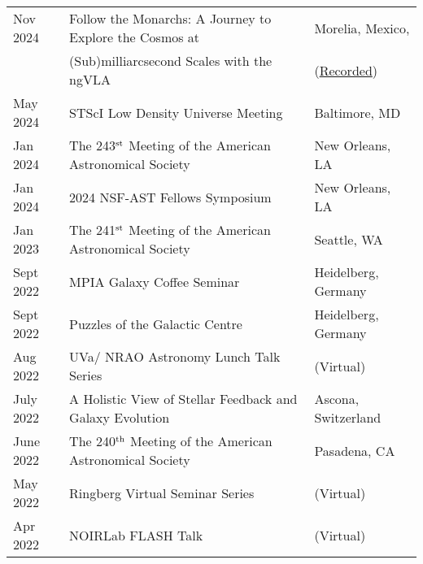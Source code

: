 \documentclass[11pt]{article}
\begin{document}
\begin{longtable}{p{} p{}p{}}

Nov 2024 & Follow the Monarchs: A Journey to Explore the Cosmos at  & {\small Morelia, Mexico,}\\
& (Sub)milliarcsecond Scales with the ngVLA & {\small(\href{https://youtu.be/CHdCz9VyqIM?si=kyrCyJ9LXm9UtWOj&t=3514}{Recorded})}\\

May 2024 & STScI Low Density Universe Meeting & {\small Baltimore, MD}\\

Jan 2024 & The 243$^{\rm st}$ Meeting of the American Astronomical Society & {\small New Orleans, LA}\\

Jan 2024 & 2024 NSF-AST Fellows Symposium & {\small New Orleans, LA}\\

Jan 2023 & The 241$^{\rm st}$ Meeting of the American Astronomical Society & {\small Seattle, WA}\\


Sept 2022 & MPIA Galaxy Coffee Seminar & {\small Heidelberg, Germany}\\

Sept 2022 & Puzzles of the Galactic Centre & {\small Heidelberg, Germany}\\

Aug 2022 & UVa/ NRAO Astronomy Lunch Talk Series & {\small (Virtual)}\\

July 2022 & A Holistic View of Stellar Feedback and Galaxy Evolution & {\small Ascona, Switzerland}\\

June  2022 &The 240$^{\rm th}$ Meeting of the American Astronomical Society & {\small Pasadena, CA}\\

May 2022 & Ringberg Virtual Seminar Series & {\small (Virtual)}\\


Apr 2022 & NOIRLab FLASH Talk & {\small (Virtual)}\\



\end{longtable}
\end{document}
